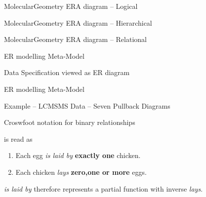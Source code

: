 \documentclass[xcolor=pst,dvips]{beamer}   %
\renewcommand{\erpictureFolder}[0]{../../SharedPictures}
\begin{document}
\begin{frame}{MolecularGeometry ERA diagram  -- Logical }
\begin{center}
\scalebox{0.5}{

}
\end{center}
\end{frame}

\begin{frame}{MolecularGeometry ERA diagram -- Hierarchical}
\begin{center}
\scalebox{0.5}{

}
\end{center}
\end{frame}

\begin{frame}{MolecularGeometry  ERA diagram -- Relational}
\begin{center}
\scalebox{0.5}{

}
\end{center}
\end{frame}


\begin{frame}{ER modelling Meta-Model}
\scalebox{0.23}{

}
\end{frame}



\begin{frame}{Data Specification viewed as ER diagram}
\begin{center}
\scalebox{0.5}{

}
\end{center}
\end{frame}
\begin{frame}{ER modelling Meta-Model}
\scalebox{0.23}{

}
\end{frame}
\begin{frame}{Example -- LCMSMS Data -- Seven Pullback Diagrams}
\scalebox{0.2}{

}
\end{frame}

\begin{frame}{Croswfoot notation for binary relationships}
\begin{center}
\scalebox{0.9}{

}
\end{center}
is read as
\begin{center}
\begin{enumerate}
\item Each egg \textit{is laid by} \textbf{exactly one} chicken.
\item Each chicken \textit{lays} \textbf{zero,one or more} eggs.
\end{enumerate}
\end{center}
 \textit{is laid by} therefore represents a partial function with inverse \textit{lays}.
\end{frame}
\end{document}
